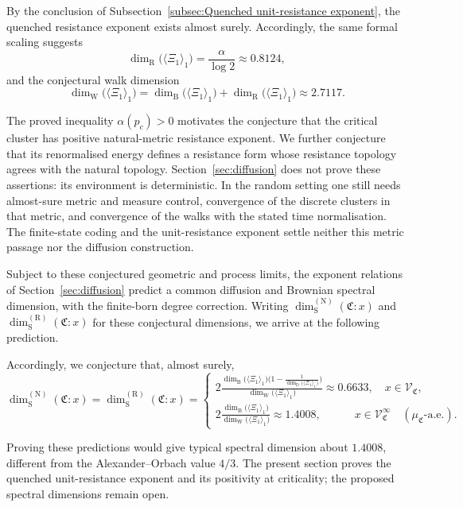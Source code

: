 \documentclass{article}
\theoremstyle{plain}
\theoremstyle{definition}
\newcommand{\dimbox}{\dim_\mathrm{B}}
\newcommand{\dimdeg}{\dim_\mathrm{D}}
\newcommand{\dimwalk}{\dim_\mathrm{W}}
\newcommand{\dimresis}{\dim_\mathrm{R}}
\newcommand{\dimspec}{\dim_\mathrm{S}}
\begin{document}
By the conclusion of Subsection~\ref{subsec:Quenched unit-resistance exponent}, the quenched resistance exponent exists almost surely.
Accordingly, the same formal scaling suggests
\[
\dimresis\big(\langle \Xi_1\rangle_1\big)
=
\frac{\alpha}{\log 2}
\approx 0.8124,
\]
and the conjectural walk dimension
\[
\dimwalk\big(\langle \Xi_1\rangle_1\big)
=
\dimbox\big(\langle \Xi_1\rangle_1\big)+\dimresis\big(\langle \Xi_1\rangle_1\big)
\approx 2.7117.
\]

\begingroup\color{red}
The proved inequality $\alpha(p_c)>0$ motivates the conjecture that the
critical cluster has positive natural-metric resistance exponent.
We further conjecture that its renormalised energy defines a resistance
form whose resistance topology agrees with the natural topology.
Section~\ref{sec:diffusion} does not prove these assertions: its
environment is deterministic. In the random setting one still needs
almost-sure metric and measure control, convergence of the discrete
clusters in that metric, and convergence of the walks with the stated
time normalisation. The finite-state coding and the unit-resistance
exponent settle neither this metric passage nor the diffusion construction.

Subject to these conjectured geometric and process limits, the exponent
relations of Section~\ref{sec:diffusion} predict a common diffusion and
Brownian spectral dimension, with the finite-born degree correction.
Writing $\dimspec^{(\mathrm N)}(\mathfrak C:x)$ and
$\dimspec^{(\mathrm R)}(\mathfrak C:x)$ for these conjectural dimensions,
we arrive at the following prediction.
\endgroup{}

Accordingly, we conjecture that, almost surely,
\[
\dimspec^{(\mathrm N)}(\mathfrak C:x)
=
\dimspec^{(\mathrm R)}(\mathfrak C:x)
=
\begin{cases}
\displaystyle
2\frac{\dimbox\big(\langle \Xi_1\rangle_1\big)\bigl(1-\frac{1}{\dimdeg\big(\langle \Xi_1\rangle_1\big)}\bigr)}{\dimwalk\big(\langle \Xi_1\rangle_1\big)}
\approx 0.6633,
\quad
x\in \mathscr V_{\mathfrak C},
\\[3mm]
\displaystyle
2\frac{\dimbox\big(\langle \Xi_1\rangle_1\big)}{\dimwalk\big(\langle \Xi_1\rangle_1\big)}
\approx 1.4008,
\quad\qquad
x\in \mathscr V_{\mathfrak C}^{\infty}
\quad
(\mu_{\mathfrak C}\text{-a.e.}).
\end{cases}
\]


\begingroup\color{red}
Proving these predictions would give typical spectral dimension about
$1.4008$, different from the Alexander--Orbach value $4/3$.
The present section proves the quenched unit-resistance exponent and
its positivity at criticality; the proposed spectral dimensions remain
open.
\endgroup{}
\end{document}

